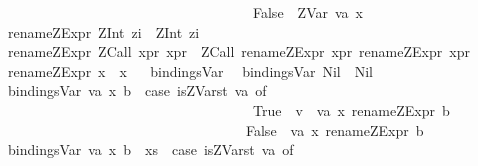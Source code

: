 \begin{isabellebody}
\ \ \ \ \ \ \ \ \ \ \ \ \ \ \ \ \ \ \ \ \ \ \ \ \ \ \ \ \ \ \ \ \ \ \ {\isacharbar}\ False\ {\isasymRightarrow}\ {\isacharparenleft}ZVar\ {\isacharparenleft}va{\isacharcomma}\ x{\isacharparenright}{\isacharparenright}{\isacharparenright}{\isachardoublequoteclose}\isanewline
{\isacharbar}\ {\isachardoublequoteopen}rename{\isacharunderscore}ZExpr\ {\isacharparenleft}ZInt\ zi{\isacharparenright}\ {\isacharequal}\ {\isacharparenleft}ZInt\ zi{\isacharparenright}{\isachardoublequoteclose}\isanewline
{\isacharbar}\ {\isachardoublequoteopen}rename{\isacharunderscore}ZExpr\ {\isacharparenleft}ZCall\ xpr{}\ xpr{}{\isacharparenright}\ {\isacharequal}\ {\isacharparenleft}ZCall\ {\isacharparenleft}rename{\isacharunderscore}ZExpr\ xpr{}{\isacharparenright}\ {\isacharparenleft}rename{\isacharunderscore}ZExpr\ xpr{}{\isacharparenright}{\isacharparenright}{\isachardoublequoteclose}\isanewline
{\isacharbar}\ {\isachardoublequoteopen}rename{\isacharunderscore}ZExpr\ x\ {\isacharequal}\ x{\isachardoublequoteclose}\isanewline
\isanewline
\ \isanewline
{}\isamarkupfalse%
\ bindingsVar\isanewline
{}\isanewline
\ \ {\isachardoublequoteopen}bindingsVar\ Nil\ {\isacharequal}\ Nil{\isachardoublequoteclose}\isanewline
{\isacharbar}\ {\isachardoublequoteopen}bindingsVar\ {\isacharbrackleft}{\isacharparenleft}{\isacharparenleft}va{\isacharcomma}\ x{\isacharparenright}{\isacharcomma}\ b{\isacharparenright}{\isacharbrackright}\ {\isacharequal}\ {\isacharparenleft}case\ {\isacharparenleft}is{\isacharunderscore}ZVar{\isacharunderscore}st\ va{\isacharparenright}\ of\isanewline
\ \ \ \ \ \ \ \ \ \ \ \ \ \ \ \ \ \ \ \ \ \ \ \ \ \ \ \ \ \ \ \ \ \ \ \ True\ {\isasymRightarrow}\ {\isacharbrackleft}{\isacharparenleft}{\isacharparenleft}{\isacharprime}{\isacharprime}v{\isacharunderscore}{\isacharprime}{\isacharprime}\ {\isacharat}\ va{\isacharcomma}\ x{\isacharparenright}{\isacharcomma}\ {\isacharparenleft}rename{\isacharunderscore}ZExpr\ b{\isacharparenright}{\isacharparenright}{\isacharbrackright}\isanewline
\ \ \ \ \ \ \ \ \ \ \ \ \ \ \ \ \ \ \ \ \ \ \ \ \ \ \ \ \ \ \ \ \ \ {\isacharbar}\ False\ {\isasymRightarrow}\ {\isacharbrackleft}{\isacharparenleft}{\isacharparenleft}va{\isacharcomma}\ x{\isacharparenright}{\isacharcomma}\ {\isacharparenleft}rename{\isacharunderscore}ZExpr\ b{\isacharparenright}{\isacharparenright}{\isacharbrackright}{\isacharparenright}{\isachardoublequoteclose}\isanewline
{\isacharbar}\ {\isachardoublequoteopen}bindingsVar\ {\isacharparenleft}{\isacharparenleft}{\isacharparenleft}va{\isacharcomma}\ x{\isacharparenright}{\isacharcomma}\ b{\isacharparenright}\ {\isacharhash}\ xs{\isacharparenright}\ {\isacharequal}\ {\isacharparenleft}case\ {\isacharparenleft}is{\isacharunderscore}ZVar{\isacharunderscore}st\ va{\isacharparenright}\ of\isanewline

\end{isabellebody}
